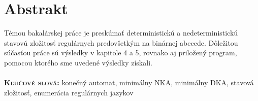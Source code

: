 \chapter{Abstrakt}
Témou bakalárskej práce je preskúmať deterministickú a nedeterministickú stavovú zložitosť regulárnych predovšetkým na binárnej abecede. Dôležitou súčasťou práce sú výsledky v kapitole 4 a 5, rovnako aj priložený program, pomocou ktorého sme uvedené výsledky získali.\\ \\
\textbf{\textsc{Kľúčové slová:}} konečný automat, minimálny NKA, minimálny DKA, stavová zložitosť, enumerácia regulárnych jazykov
